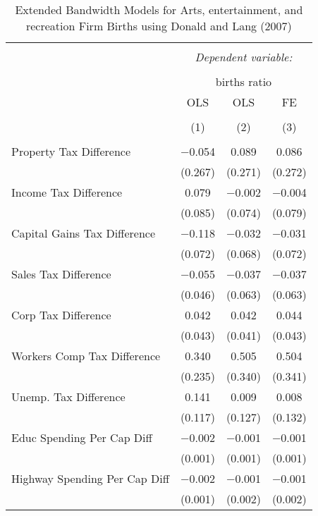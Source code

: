 
\begin{table}[!htbp] \centering 
  \caption{Extended Bandwidth Models for  Arts, entertainment, and recreation Firm Births using Donald and Lang (2007)} 
  \label{} 
\begin{tabular}{@{\extracolsep{5pt}}lccc} 
\\[-1.8ex]\hline 
\hline \\[-1.8ex] 
 & \multicolumn{3}{c}{\textit{Dependent variable:}} \\ 
\cline{2-4} 
\\[-1.8ex] & \multicolumn{3}{c}{births ratio} \\ 
 & OLS & OLS & FE \\ 
\\[-1.8ex] & (1) & (2) & (3)\\ 
\hline \\[-1.8ex] 
 Property Tax Difference & $-$0.054 & 0.089 & 0.086 \\ 
  & (0.267) & (0.271) & (0.272) \\ 
  Income Tax Difference & 0.079 & $-$0.002 & $-$0.004 \\ 
  & (0.085) & (0.074) & (0.079) \\ 
  Capital Gains Tax Difference & $-$0.118 & $-$0.032 & $-$0.031 \\ 
  & (0.072) & (0.068) & (0.072) \\ 
  Sales Tax Difference & $-$0.055 & $-$0.037 & $-$0.037 \\ 
  & (0.046) & (0.063) & (0.063) \\ 
  Corp Tax Difference & 0.042 & 0.042 & 0.044 \\ 
  & (0.043) & (0.041) & (0.043) \\ 
  Workers Comp Tax Difference & 0.340 & 0.505 & 0.504 \\ 
  & (0.235) & (0.340) & (0.341) \\ 
  Unemp. Tax Difference & 0.141 & 0.009 & 0.008 \\ 
  & (0.117) & (0.127) & (0.132) \\ 
  Educ Spending Per Cap Diff & $-$0.002 & $-$0.001 & $-$0.001 \\ 
  & (0.001) & (0.001) & (0.001) \\ 
  Highway Spending Per Cap Diff & $-$0.002 & $-$0.001 & $-$0.001 \\ 
  & (0.001) & (0.002) & (0.002) \\ 

\end{tabular}
\end{table}
